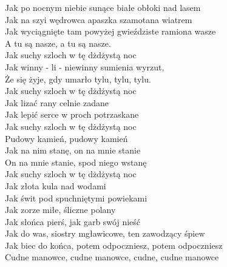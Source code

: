 
\begin{flushleft}
Jak po nocnym niebie sunące białe obłoki nad lasem \\
Jak na szyi wędrowca apaszka szamotana wiatrem \\
Jak wyciągnięte tam powyżej gwieździste ramiona wasze \\
A tu są nasze, a tu są nasze. \\
\vskip 3mm
Jak suchy szloch w tę dżdżystą noc \\
Jak winny - li - niewinny sumienia wyrzut, \\
Że się żyje, gdy umarło tylu, tylu, tylu. \\
\vskip 3mm
Jak suchy szloch w tę dżdżystą noc \\
Jak lizać rany celnie zadane \\
Jak lepić serce w proch potrzaskane \\
\vskip 3mm
Jak suchy szloch w tę dżdżystą noc \\
Pudowy kamień, pudowy kamień \\
Jak na nim stanę, on na mnie stanie \\
On na mnie stanie, spod niego wstanę \\
\vskip 3mm
Jak suchy szloch w tę dżdżystą noc \\
Jak złota kula nad wodami \\
Jak świt pod spuchniętymi powiekami \\
\vskip 3mm
Jak zorze miłe, śliczne polany \\
Jak słońca pierś, jak garb swój nieść \\
Jak do was, siostry mgławicowe, ten zawodzący śpiew \\
\vskip 3mm
Jak biec do końca, potem odpoczniesz, potem odpoczniesz \\
Cudne manowce, cudne manowce, cudne, cudne manowce \\
\end{flushleft}
\clearpage
